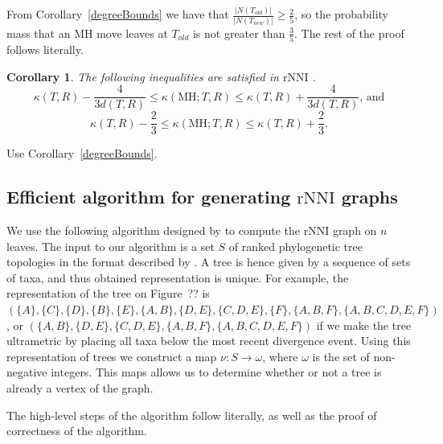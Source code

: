 \documentclass{amsart}
\newtheorem{corollary}[lemma]{Corollary}
\theoremstyle{definition}
\newcommand{\rnni}{\mathrm{rNNI}}
\newcommand{\MH}{\mathrm{MH}}
\begin{document}
{\proof
From Corollary~\ref{degreeBounds} we have that $\frac{|N(T_{old})|}{|N(T_{new})|} \geq \frac{2}{5}$, so the probability mass that an MH move leaves at $T_{old}$ is not greater than $\frac35$.
The rest of the proof follows \autocite[][Proof of Lemma~V.8]{Whidden2015-es} literally.
\endproof

\begin{corollary}
The following inequalities are satisfied in $\rnni$ .
\[
\kappa(T,R) - \dfrac{4}{3d(T,R)} \leq \kappa(\MH;T,R) \leq \kappa(T,R) +
\dfrac{4}{3d(T,R)}\mbox{, and}
\]
\[
\kappa(T,R) - \dfrac23 \leq \kappa(\MH;T,R) \leq \kappa(T,R) + \dfrac23.
\]
\end{corollary}

\proof
Use Corollary~\ref{degreeBounds}.
\endproof
}{}


\subsection{Efficient algorithm for generating $\rnni$ graphs}

We use the following algorithm designed by \textcite{Whidden2015-es} to compute the $\rnni$ graph on $n$ leaves.
The input to our algorithm is a set $S$ of ranked phylogenetic tree topologies in the format described by \textcite{Gavryushkin2014-bw} \autocite[see also][]{Semple2003-nj}.
A tree is hence given by a sequence of sets of taxa, and thus obtained representation is unique.
For example, the representation of the tree on Figure~?? \todo{} is $(\{A\}, \{C\}, \{D\}, \{B\}, \{E\}, \{A,B\}, \{D,E\}, \{C, D, E\}, \{F\}, \{A,B,F\}, \{A,B,C,D,E,F\})$, or
$(\{A,B\}, \{D,E\}, \{C, D, E\}, \{A,B,F\}, \{A,B,C,D,E,F\})$ if we make the tree ultrametric by placing all taxa below the most recent divergence event.
Using this representation of trees we construct a map $\nu : S \to \omega$, where $\omega$ is the set of non-negative integers.
This maps allows us to determine whether or not a tree is already a vertex of the graph.

The high-level steps of the algorithm follow \textcite{Whidden2015-es} literally, as well as the proof of correctness of the algorithm.
\end{document}
